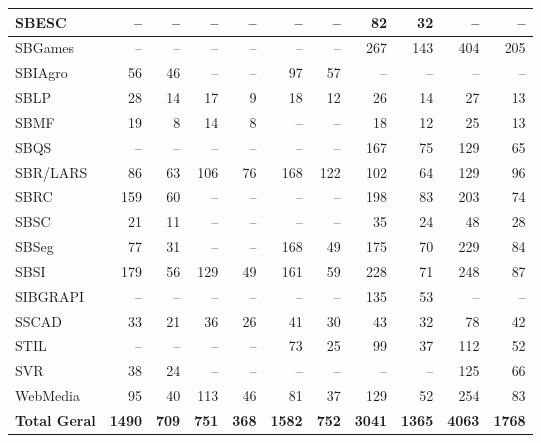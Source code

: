 \begin{table}[H]
\begin{tabular}{|l|rr|rr|rr|rr|rr|}
SBESC & -- & -- & -- & -- & -- & -- & 82 & 32 & -- & -- \\ \hline
SBGames & -- & -- & -- & -- & -- & -- & 267 & 143 & 404 & 205 \\ \hline
SBIAgro & 56 & 46 & -- & -- & 97 & 57 & -- & -- & -- & -- \\ \hline
SBLP & 28 & 14 & 17 & 9 & 18 & 12 & 26 & 14 & 27 & 13 \\ \hline
SBMF & 19 & 8 & 14 & 8 & -- & -- & 18 & 12 & 25 & 13 \\ \hline
SBQS & -- & -- & -- & -- & -- & -- & 167 & 75 & 129 & 65 \\ \hline
SBR/LARS & 86 & 63 & 106 & 76 & 168 & 122 & 102 & 64 & 129 & 96 \\ \hline
SBRC & 159 & 60 & -- & -- & -- & -- & 198 & 83 & 203 & 74 \\ \hline
SBSC & 21 & 11 & -- & -- & -- & -- & 35 & 24 & 48 & 28 \\ \hline
SBSeg & 77 & 31 & -- & -- & 168 & 49 & 175 & 70 & 229 & 84 \\ \hline
SBSI & 179 & 56 & 129 & 49 & 161 & 59 & 228 & 71 & 248 & 87 \\ \hline
SIBGRAPI & -- & -- & -- & -- & -- & -- & 135 & 53 & -- & -- \\ \hline
SSCAD & 33 & 21 & 36 & 26 & 41 & 30 & 43 & 32 & 78 & 42 \\ \hline
STIL & -- & -- & -- & -- & 73 & 25 & 99 & 37 & 112 & 52 \\ \hline
SVR & 38 & 24 & -- & -- & -- & -- & -- & -- & 125 & 66 \\ \hline
WebMedia & 95 & 40 & 113 & 46 & 81 & 37 & 129 & 52 & 254 & 83 \\ \hline
\textbf{Total Geral} & \textbf{1490} & \textbf{709} & \textbf{751} & \textbf{368} & \textbf{1582} & \textbf{752} & \textbf{3041} & \textbf{1365} & \textbf{4063} & \textbf{1768} \\ \hline
\end{tabular}

\end{table}